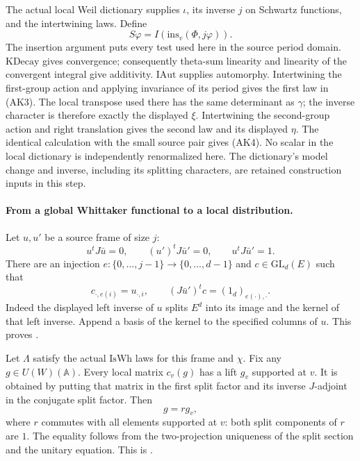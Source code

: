 The actual local Weil dictionary supplies \(\iota\), its inverse
\(j\) on Schwartz functions, and the intertwining laws.
Define
\[
                  S\varphi=I(\mathrm{ins}_v(\Phi,j\varphi)).
 \tag{AK5}\label{eq:sr-source-local-period-construction}
\]
The insertion argument puts every test used here in the source
period domain. \(\mathrm{KDecay}\) gives convergence; consequently
theta-sum linearity and linearity of the convergent integral give
additivity. \(\mathrm{IAut}\) supplies automorphy.
Intertwining the first-group action and applying invariance of its
period gives the first law in (AK3). The local transpose used there
has the same determinant as \(\gamma\); the inverse character is
therefore exactly the displayed \(\xi\).
Intertwining the second-group action and right translation gives
the second law and its displayed \(\eta\).
The identical calculation with the small source pair gives (AK4).
No scalar in the local dictionary is independently renormalized here.
The dictionary's model change and inverse, including its splitting
characters, are retained construction inputs in this step.

\paragraph{From a global Whittaker functional to a local distribution.}
Let \(u,u'\) be a source frame of size \(j\):
\[
 u^tJ\bar u=0,\qquad (u')^tJ\bar u'=0,\qquad u^tJ\bar u'=1.
\]
There are an injection \(e:\{0,\ldots,j-1\}\to\{0,\ldots,d-1\}\)
and \(c\in\mathrm{GL}_d(E)\) such that
\[
 c_{\cdot,e(i)}=u_{\cdot,i},\qquad
 (J\bar u')^t c=(1_d)_{e(\cdot),\cdot}.
 \tag{AK6}\label{eq:sr-source-frame-complement}
\]
Indeed the displayed left inverse of \(u\) splits \(E^d\) into
its image and the kernel of that left inverse. Append a basis of
the kernel to the specified columns of \(u\).
This proves .

Let \(\Lambda\) satisfy the actual \(\mathrm{IsWh}\) laws for this
frame and \(\chi\). Fix any \(g\in U(W)(\mathbb A)\).
Every local matrix \(c_v(g)\) has a lift \(g_v\) supported at \(v\).
It is obtained by putting that matrix in the first split factor
and its inverse \(J\)-adjoint in the conjugate split factor.
Then
\[
                       g=r g_v,
\]
where \(r\) commutes with all elements supported at \(v\):
both split components of \(r\) are \(1\).
The equality follows from the two-projection uniqueness of the split
section and the unitary equation. This is .

